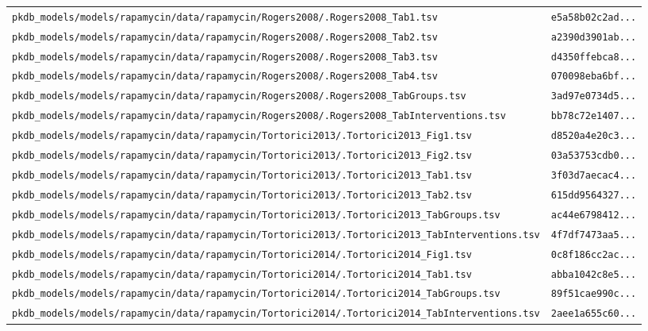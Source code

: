 \documentclass{article}
\begin{document}
\begin{longtable}{ll}
\texttt{pkdb\_models/models/rapamycin/data/rapamycin/Rogers2008/.Rogers2008\_Tab1.tsv} & \texttt{e5a58b02c2ad...} \\
\texttt{pkdb\_models/models/rapamycin/data/rapamycin/Rogers2008/.Rogers2008\_Tab2.tsv} & \texttt{a2390d3901ab...} \\
\texttt{pkdb\_models/models/rapamycin/data/rapamycin/Rogers2008/.Rogers2008\_Tab3.tsv} & \texttt{d4350ffebca8...} \\
\texttt{pkdb\_models/models/rapamycin/data/rapamycin/Rogers2008/.Rogers2008\_Tab4.tsv} & \texttt{070098eba6bf...} \\
\texttt{pkdb\_models/models/rapamycin/data/rapamycin/Rogers2008/.Rogers2008\_TabGroups.tsv} & \texttt{3ad97e0734d5...} \\
\texttt{pkdb\_models/models/rapamycin/data/rapamycin/Rogers2008/.Rogers2008\_TabInterventions.tsv} & \texttt{bb78c72e1407...} \\
\texttt{pkdb\_models/models/rapamycin/data/rapamycin/Tortorici2013/.Tortorici2013\_Fig1.tsv} & \texttt{d8520a4e20c3...} \\
\texttt{pkdb\_models/models/rapamycin/data/rapamycin/Tortorici2013/.Tortorici2013\_Fig2.tsv} & \texttt{03a53753cdb0...} \\
\texttt{pkdb\_models/models/rapamycin/data/rapamycin/Tortorici2013/.Tortorici2013\_Tab1.tsv} & \texttt{3f03d7aecac4...} \\
\texttt{pkdb\_models/models/rapamycin/data/rapamycin/Tortorici2013/.Tortorici2013\_Tab2.tsv} & \texttt{615dd9564327...} \\
\texttt{pkdb\_models/models/rapamycin/data/rapamycin/Tortorici2013/.Tortorici2013\_TabGroups.tsv} & \texttt{ac44e6798412...} \\
\texttt{pkdb\_models/models/rapamycin/data/rapamycin/Tortorici2013/.Tortorici2013\_TabInterventions.tsv} & \texttt{4f7df7473aa5...} \\
\texttt{pkdb\_models/models/rapamycin/data/rapamycin/Tortorici2014/.Tortorici2014\_Fig1.tsv} & \texttt{0c8f186cc2ac...} \\
\texttt{pkdb\_models/models/rapamycin/data/rapamycin/Tortorici2014/.Tortorici2014\_Tab1.tsv} & \texttt{abba1042c8e5...} \\
\texttt{pkdb\_models/models/rapamycin/data/rapamycin/Tortorici2014/.Tortorici2014\_TabGroups.tsv} & \texttt{89f51cae990c...} \\
\texttt{pkdb\_models/models/rapamycin/data/rapamycin/Tortorici2014/.Tortorici2014\_TabInterventions.tsv} & \texttt{2aee1a655c60...} \\

\end{longtable}
\end{document}
